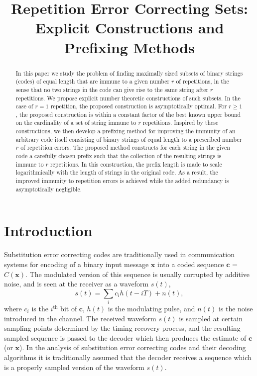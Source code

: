 \documentclass[12pt]{article} \pagestyle{plain} \topmargin
\begin{document}
\title{Repetition Error Correcting Sets: Explicit Constructions and Prefixing Methods}
\maketitle

\begin{abstract}
In this paper we study the problem of finding maximally sized
subsets of binary strings (codes) of equal length that are immune to
a given number $r$ of repetitions, in the sense that no two strings
in the code can give rise to the same string after $r$ repetitions.
We propose explicit number theoretic constructions of such subsets.
In the case of $r=1$ repetition, the proposed construction is
asymptotically optimal. For $r \geq 1$, the proposed construction is
within a constant factor of the best known upper bound on the
cardinality of a set of string immune to $r$ repetitions. Inspired
by these constructions, we then develop a prefixing method for
improving the immunity of an arbitrary code itself consisting of
binary strings of equal length to a prescribed number $r$ of
repetition errors. The proposed method constructs for each string in
the given code a carefully chosen prefix such that the collection of
the resulting strings is immune to $r$ repetitions. In this
construction, the prefix length is made to scale logarithmically
with the length of strings in the original code. As a result, the
improved immunity to repetition errors is achieved while the added
redundancy is asymptotically negligible.
\end{abstract}



\section{Introduction}\label{intro}

Substitution error correcting codes are traditionally used in
communication systems for encoding of a binary input message
$\mathbf{x}$ into a coded sequence $\mathbf{c}$ = $C(\mathbf{x})$.
The modulated version of this sequence is usually corrupted by
additive noise, and is seen at the receiver as a waveform $s(t)$,
\begin{equation}\label{eq:rt}
s(t)=\sum_{i} c_i h(t-iT) +n(t),
\end{equation}
where $c_i$ is the $i^{\text{th}}$ %
bit of $\mathbf{c}$, $h(t)$ is the modulating pulse, and $n(t)$ is
the noise introduced in the channel. The received waveform $s(t)$
is sampled at certain sampling points determined by the timing
recovery process, and the resulting sampled sequence is passed to
the decoder which then produces the estimate of $\mathbf{c}$ (or
$\mathbf{x}$). In the analysis of substitution error correcting
codes and their decoding algorithms it is traditionally assumed
that the decoder receives a sequence which is a properly sampled
version of the waveform $s(t)$.
\end{document}
